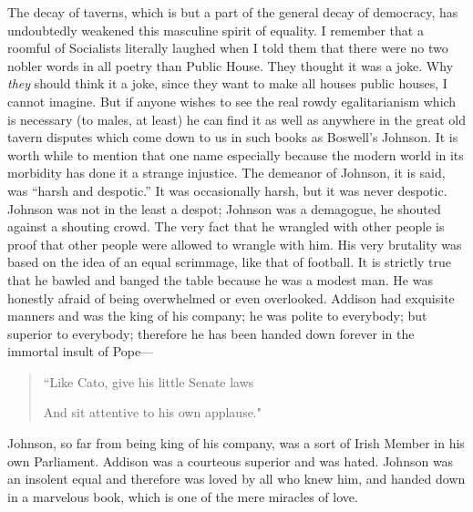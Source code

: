 \documentclass{book}
\begin{document}
The decay of taverns, which is but a part of the general decay of democracy, has undoubtedly weakened this masculine spirit of equality. I remember that a roomful of Socialists literally laughed when I told them that there were no two nobler words in all poetry than Public House. They thought it was a joke. Why \emph{they} should think it a joke, since they want to make all houses public houses, I cannot imagine. But if anyone wishes to see the real rowdy egalitarianism which is necessary (to males, at least) he can find it as well as anywhere in the great old tavern disputes which come down to us in such books as Boswell’s Johnson. It is worth while to mention that one name especially because the modern world in its morbidity has done it a strange injustice. The demeanor of Johnson, it is said, was “harsh and despotic.” It was occasionally harsh, but it was never despotic. Johnson was not in the least a despot; Johnson was a demagogue, he shouted against a shouting crowd. The very fact that he wrangled with other people is proof that other people were allowed to wrangle with him. His very brutality was based on the idea of an equal scrimmage, like that of football. It is strictly true that he bawled and banged the table because he was a modest man. He was honestly afraid of being overwhelmed or even overlooked. Addison had exquisite manners and was the king of his company; he was polite to everybody; but superior to everybody; therefore he has been handed down forever in the immortal insult of Pope—

\begin{quotation}
	“Like Cato, give his little Senate laws

	And sit attentive to his own applause."
\end{quotation}

Johnson, so far from being king of his company, was a sort of Irish Member in his own Parliament. Addison was a courteous superior and was hated. Johnson was an insolent equal and therefore was loved by all who knew him, and handed down in a marvelous book, which is one of the mere miracles of love.
\end{document}
